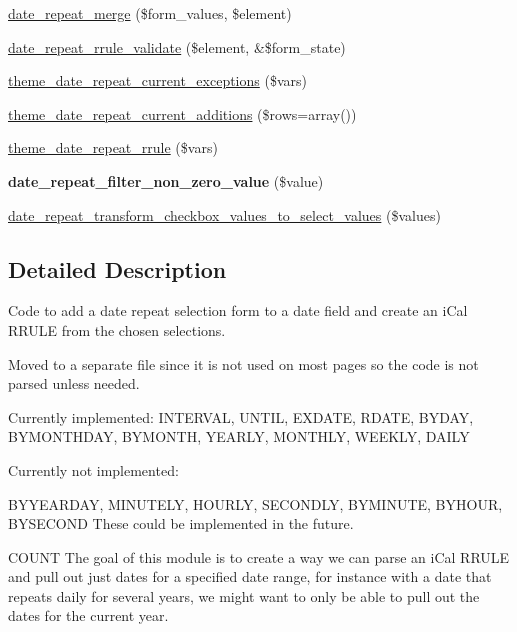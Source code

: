 \begin{DoxyCompactItemize}
\item 
\hyperlink{date__repeat__form_8inc_a79c5abcab182e5c6195eb60b7933e927}{date\_\-repeat\_\-merge} (\$form\_\-values, \$element)
\item 
\hyperlink{date__repeat__form_8inc_a72736d70f374c2a39e89c6988b28c724}{date\_\-repeat\_\-rrule\_\-validate} (\$element, \&\$form\_\-state)
\item 
\hyperlink{date__repeat__form_8inc_a2dbdfbf5bd0d003c35b94e86da37093c}{theme\_\-date\_\-repeat\_\-current\_\-exceptions} (\$vars)
\item 
\hyperlink{date__repeat__form_8inc_ac506967b460505306823f02dc8a134ab}{theme\_\-date\_\-repeat\_\-current\_\-additions} (\$rows=array())
\item 
\hyperlink{date__repeat__form_8inc_a3f1fc7954d4c804a9cd8889e5b97bf5b}{theme\_\-date\_\-repeat\_\-rrule} (\$vars)
\item 
\hypertarget{date__repeat__form_8inc_a211d5e12a1ad00c75450c586bba714d1}{
{\bfseries date\_\-repeat\_\-filter\_\-non\_\-zero\_\-value} (\$value)}
\label{date__repeat__form_8inc_a211d5e12a1ad00c75450c586bba714d1}

\item 
\hyperlink{date__repeat__form_8inc_a1cc859e7eefd5ec7d2ac0e90f8d81468}{date\_\-repeat\_\-transform\_\-checkbox\_\-values\_\-to\_\-select\_\-values} (\$values)
\end{DoxyCompactItemize}


\subsection{Detailed Description}
Code to add a date repeat selection form to a date field and create an iCal RRULE from the chosen selections.

Moved to a separate file since it is not used on most pages so the code is not parsed unless needed.

Currently implemented: INTERVAL, UNTIL, EXDATE, RDATE, BYDAY, BYMONTHDAY, BYMONTH, YEARLY, MONTHLY, WEEKLY, DAILY

Currently not implemented:

BYYEARDAY, MINUTELY, HOURLY, SECONDLY, BYMINUTE, BYHOUR, BYSECOND These could be implemented in the future.

COUNT The goal of this module is to create a way we can parse an iCal RRULE and pull out just dates for a specified date range, for instance with a date that repeats daily for several years, we might want to only be able to pull out the dates for the current year.

